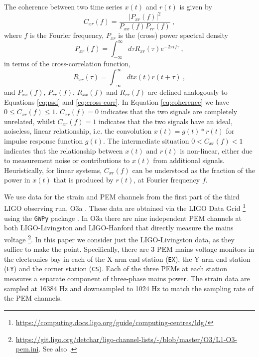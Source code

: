 \documentclass[pra,superscriptaddress,reprint,amsmath,amssymb,nofootinbib]{revtex4-2}
\begin{document}
The coherence between two time series $x(t)$ and $r(t)$ is given by 
\begin{equation}
	C_{xr}(f)	= \frac{|P_{xr}(f)|^2}{P_{xx}(f) P_{rr}(f)} \ , \label{eq:coherence}
\end{equation}
where $f$ is the Fourier frequency, $P_{xr}$ is the (cross) power spectral density
\begin{equation}
	P_{xr}(f)	= \int_{-\infty}^{\infty} d \tau R_{xr}(\tau) e^{-2 \pi i f \tau }  \ ,    \label{eq:psd}
\end{equation}
in terms of the cross-correlation function,
\begin{equation}
	R_{xr}(\tau) = \int_{-\infty}^{\infty} dt x(t) r(t+ \tau)  \ ,  \label{eq:cross-corr}
\end{equation}
and $P_{xx}(f)$, $P_{rr}(f)$, $R_{xx}(f)$ and $R_{rr}(f)$ are defined analogously to Equations \eqref{eq:psd} and \eqref{eq:cross-corr}. In Equation \eqref{eq:coherence} we have $0 \leq C_{xr}(f) \leq 1$. $C_{xr}(f) = 0$ indicates that the two signals are completely unrelated, whilst $C_{xr}(f) = 1$ indicates that the two signals have an ideal, noiseless, linear relationship, i.e. the convolution $x(t) = g(t) \ast r(t)$ for impulse response function $g(t)$.  The intermediate situation $ 0 < C_{xr}(f) < 1$ indicates that the relationship between $x(t)$ and $r(t)$ is non-linear, either due to measurement noise or contributions to $x(t)$ from additional signals. Heuristically, for linear systems, $C_{xr}(f)$ can be understood as the fraction of the power in $x(t)$ that is produced by $r(t)$, at Fourier frequency $f$. \newline 


We use data for the strain and PEM channels from the first part of the third LIGO observing run, O3a \cite{LIGO_O3}. These data are obtained via the LIGO Data Grid  \footnote{\url{https://computing.docs.ligo.org/guide/computing-centres/ldg/}} using the \texttt{GWPy} package \cite{gwpy}. In O3a there are nine independent PEM channels at both LIGO-Livingston and LIGO-Hanford that directly measure the mains voltage \footnote{\url{https://git.ligo.org/detchar/ligo-channel-lists/-/blob/master/O3/L1-O3-pem.ini}. See also \cite{pemrefs}.}. In this paper we consider just the LIGO-Livingston data, as they suffice to make the point. Specifically, there are 3 PEM mains voltage monitors in the electronics bay in each of the X-arm end station (\texttt{EX}), the Y-arm end station (\texttt{EY}) and the corner station (\texttt{CS}). Each of the three PEMs at each station measures a separate component of three-phase mains power. The strain data are sampled at 16384 Hz and downsampled to 1024 Hz to match the sampling rate of the PEM channels. \newline 
\end{document}
